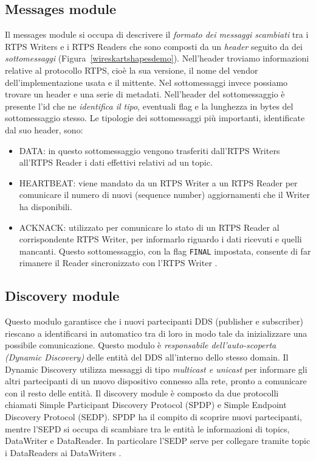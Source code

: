 \subsection{Messages module}
Il messages module si occupa di descrivere il \textit{formato dei messaggi scambiati}
tra i RTPS Writers e i RTPS Readers che sono composti da un \textit{header}
seguito da dei \textit{sottomessaggi} (Figura~\ref{wireskartshapesdemo}). 
Nell'header troviamo informazioni relative al
protocollo RTPS, cioè la sua versione, il nome del vendor dell'implementazione
usata e il mittente. Nel sottomessaggi invece possiamo trovare un header
e una serie di metadati. Nell'header del sottomessaggio
è presente l'id che ne
\textit{identifica il tipo}, eventuali flag e la lunghezza in bytes 
del sottomessaggio stesso. Le tipologie dei sottomessaggi più importanti, 
identificate dal suo header, sono:
\begin{itemize}
    \item DATA: in questo sottomessaggio vengono trasferiti dall'RTPS Writers
    all'RTPS Reader i dati effettivi relativi ad un topic.
    \item HEARTBEAT: viene mandato da un RTPS Writer a un RTPS Reader per 
    comunicare il numero di nuovi (sequence number) aggiornamenti che il 
    Writer ha disponibili.
    \item ACKNACK: utilizzato per comunicare lo stato di un RTPS Reader 
    al corrispondente RTPS Writer, per informarlo riguardo i dati ricevuti
    e quelli mancanti. Questo sottomessaggio, con la flag \texttt{FINAL} 
    impostata, consente di far rimanere il Reader sincronizzato con l'RTPS
    Writer \cite{ddsrtps}.
\end{itemize} \label{Messages module}


\subsection{Discovery module}
Questo modulo garantisce che i nuovi partecipanti DDS (publisher e subscriber)
riescano a identificarsi in automatico tra di loro in modo tale da inizializzare una 
possibile comunicazione. Questo modulo 
è \textit{responsabile dell'auto-scoperta 
(Dynamic Discovery)}
delle entità del DDS all'interno dello stesso domain. Il Dynamic Discovery
utilizza messaggi di tipo \textit{multicast e unicast} 
per informare gli altri partecipanti
di un nuovo dispositivo connesso alla rete, pronto a comunicare con il
resto delle entità. Il discovery module è composto da due protocolli chiamati
Simple Participant Discovery Protocol (SPDP) e 
Simple Endpoint Discovery Protocol (SEDP). 
SPDP ha il compito di scoprire nuovi 
partecipanti, mentre l'SEPD si occupa di scambiare tra
le entità le informazioni
di topics, DataWriter e DataReader. In particolare l'SEDP serve per collegare
tramite topic i DataReaders ai DataWriters \cite{ddsrtps}.
\label{Discovery module}

